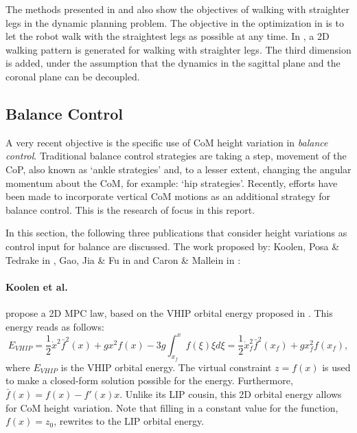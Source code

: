 The methods presented in \cite{brasseur2015robust} and \cite{kajita2017biped} also show the objectives of walking with straighter legs in the dynamic planning problem. The objective in the optimization in \cite{brasseur2015robust} is to let the robot walk with the straightest legs as possible at any time. In \cite{kajita2017biped}, a \ac{2D} walking pattern is generated for walking with straighter legs. The third dimension is added, under the assumption that the dynamics in the sagittal plane and the coronal plane can be decoupled. 
\subsection{Balance Control}\label{subsec:heightbalance}
A very recent objective is the specific use of \ac{CoM} height variation in \textit{balance control}. Traditional balance control strategies are taking a step, movement of the \ac{CoP}, also known as `ankle strategies' and, to a lesser extent, changing the angular momentum about the \ac{CoM}, for example: `hip strategies'. Recently, efforts have been made to incorporate vertical \ac{CoM} motions as an additional strategy for balance control. This is the research of focus in this report.

In this section, the following three publications that consider height variations as control input for balance are discussed. The work proposed by: Koolen, Posa \& Tedrake in \cite{koolen2016balance},  Gao, Jia \& Fu in \cite{gao2017increase} and  Caron \& Mallein in \cite{caron2018balance}:

\paragraph{Koolen et al.} propose a \ac{2D} \ac{MPC} law, based on the \ac{VHIP} orbital energy proposed in \cite{pratt2007derivation}. This energy reads as follows:
\begin{equation}\label{eq:evhip}
    E_{VHIP}  = \frac{1}{2}\dot{x}^2\bar{f}^2(x)+gx^2f(x) - 3g\int_{x_f}^{x} f(\xi)\xi d\xi = \frac{1}{2}\dot{x}_f^2\bar{f}^2(x_f)+gx_f^2f(x_f),
\end{equation}
where $E_{VHIP}$ is the \ac{VHIP} orbital energy. The virtual constraint $z=f(x)$ is used to make a closed-form solution possible for the energy. Furthermore, $\bar{f}(x)=f(x)-f'(x)x$. Unlike its \ac{LIP} cousin, this \ac{2D} orbital energy allows for \ac{CoM} height variation. Note that filling in a constant value for the function, $f(x)=z_0$, rewrites to the \ac{LIP} orbital energy.

